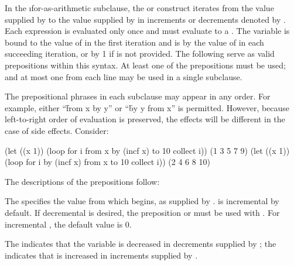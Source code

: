 
In the \i{for-as-arithmetic} subclause, the  
or  construct iterates from the value supplied by
 to the value supplied by  in increments or
decrements denoted by . Each
expression is evaluated only once and must evaluate to a .  
The variable  is bound to the value of 
 in the first iteration and is 
by the value of  in each succeeding iteration,
or by 1 if  is not provided.  
The following  serve as valid prepositions within this 
syntax.
At least one of the 
prepositions must be used; 
and at most one from each line may be used in a single subclause.

\beginlist                 
 
 
 
\endlist

The prepositional phrases in each subclause may appear in any order.
For example, either ``\f{from x by y}'' or ``\f{by y from x}'' is permitted.
However, because left-to-right order of evaluation is preserved,
the effects will be different in the case of side effects.
%
Consider:

\code
(let ((x 1)) (loop for i from x by (incf x) to 10 collect i))
\EV (1 3 5 7 9)
(let ((x 1)) (loop for i by (incf x) from x to 10 collect i))
\EV (2 4 6 8 10)
\endcode
{}
 
The descriptions of the prepositions follow:
 
\beginlist
{}
 
The   specifies the value from which
 begins, as supplied by .  
 is incremental by default.  If 
decremental  is desired, 
the preposition  
or  must be used with .  For incremental
, the default  value is 0.

 
The   
indicates that the variable  is decreased in decrements
supplied by ; the   indicates that 
 is increased in increments supplied by .
 
